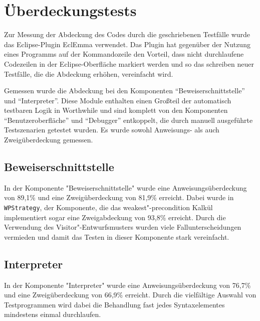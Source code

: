 \section{Überdeckungstests}
Zur Messung der Abdeckung des Codes durch die geschriebenen Testfälle wurde das Eclipse-Plugin EclEmma verwendet. Das Plugin hat gegenüber der Nutzung eines Programms auf der Kommandozeile den Vorteil, dass nicht durchlaufene Codezeilen in der Eclipse-Oberfläche markiert werden und so das schreiben neuer Testfälle, die die Abdeckung erhöhen, vereinfacht wird.

Gemessen wurde die Abdeckung bei den Komponenten ``Beweiserschnittstelle'' und ``Interpreter''. Diese Module enthalten einen Großteil der automatisch testbaren Logik in Worthwhile und sind komplett von den Komponenten ``Benutzeroberfläche'' und ``Debugger'' entkoppelt, die durch manuell ausgeführte Testszenarien getestet wurden. Es wurde sowohl Anweisungs- als auch Zweigüberdeckung gemessen.

\subsection{Beweiserschnittstelle}
In der Komponente "Beweiserschnittstelle" wurde eine Anweisungsüberdeckung von 89,1\% und eine Zweigüberdeckung von 81,9\% erreicht. Dabei wurde in \texttt{WPStrategy}, der Komponente, die das weakest"-precondition Kalkül implementiert sogar eine Zweigabdeckung von 93,8\% erreicht. Durch die Verwendung des Visitor"-Entwurfsmusters wurden viele Fallunterscheidungen vermieden und damit das Testen in dieser Komponente stark vereinfacht.

\subsection{Interpreter}
In der Komponente "Interpreter" wurde eine Anweisungsüberdeckung von 76,7\% und eine Zweigüberdeckung von 66,9\% erreicht. Durch die vielfältige Auswahl von Testprogrammen wird dabei die Behandlung fast jedes Syntaxelementes mindestens einmal durchlaufen.
